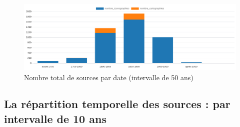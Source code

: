 \begin{figure}[h!]
    \centering
    \includegraphics[width=0.75\linewidth]{images/graphiques/total_source_date_50.png}
    \caption{Nombre total de sources par date (intervalle de 50 ans)}
    \label{fig:total_sources_date50}
\end{figure}

\newpage
\subsection{La répartition temporelle des sources : par intervalle de 10 ans}
